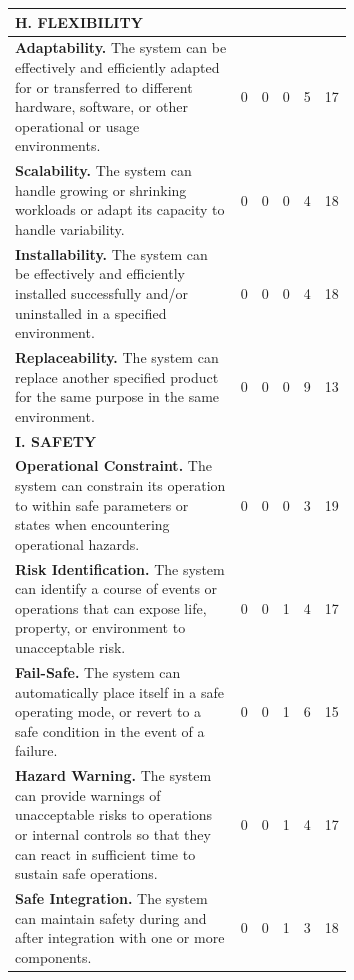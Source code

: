 \begin{longtable}{p{0.67\linewidth} c c c c c}
\multicolumn{6}{l}{\textbf{H. FLEXIBILITY}} \\
\midrule
\textbf{Adaptability.} The system can be effectively and efficiently adapted for or transferred to different hardware, software, or other operational or usage environments. & 0 & 0 & 0 & 5 & 17 \\
\textbf{Scalability.} The system can handle growing or shrinking workloads or adapt its capacity to handle variability. & 0 & 0 & 0 & 4 & 18 \\
\textbf{Installability.} The system can be effectively and efficiently installed successfully and/or uninstalled in a specified environment. & 0 & 0 & 0 & 4 & 18 \\
\textbf{Replaceability.} The system can replace another specified product for the same purpose in the same environment. & 0 & 0 & 0 & 9 & 13 \\
\midrule

\multicolumn{6}{l}{\textbf{I. SAFETY}} \\
\midrule
\textbf{Operational Constraint.} The system can constrain its operation to within safe parameters or states when encountering operational hazards. & 0 & 0 & 0 & 3 & 19 \\
\textbf{Risk Identification.} The system can identify a course of events or operations that can expose life, property, or environment to unacceptable risk. & 0 & 0 & 1 & 4 & 17 \\
\textbf{Fail-Safe.} The system can automatically place itself in a safe operating mode, or revert to a safe condition in the event of a failure. & 0 & 0 & 1 & 6 & 15 \\
\textbf{Hazard Warning.} The system can provide warnings of unacceptable risks to operations or internal controls so that they can react in sufficient time to sustain safe operations. & 0 & 0 & 1 & 4 & 17 \\
\textbf{Safe Integration.} The system can maintain safety during and after integration with one or more components. & 0 & 0 & 1 & 3 & 18 \\

\end{longtable}
